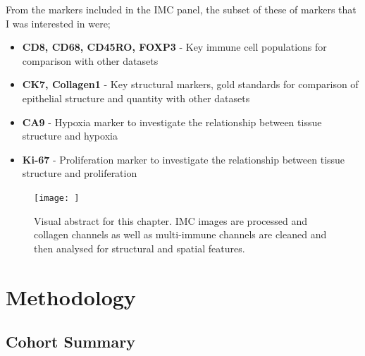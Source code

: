 From the markers included in the IMC panel, the subset of these of markers that I was interested in were;
\begin{itemize}
\item \textbf{CD8, CD68, CD45RO, FOXP3} - Key immune cell populations for comparison with other datasets
\item \textbf{CK7, Collagen1} - Key structural markers, gold standards for comparison of epithelial structure and quantity with other datasets
\item \textbf{CA9} - Hypoxia marker to investigate the relationship between tissue structure and hypoxia
\item \textbf{Ki-67} - Proliferation marker to investigate the relationship between tissue structure and proliferation \end{itemize}

\begin{figure}
    \centering
    \texttt{[image: ]}
    \caption{Visual abstract for this chapter. IMC images are processed and collagen channels as well as multi-immune channels are cleaned and then analysed for structural and spatial features.}
    \label{fig:ch5_visualabstract}
\end{figure}



\section[Methodology]{Methodology}
\subsection{Cohort Summary}
